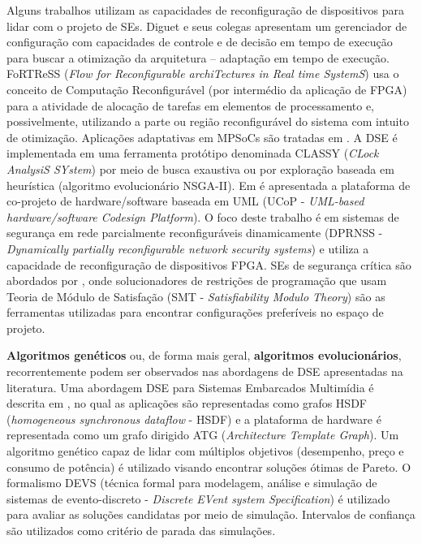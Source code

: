 \documentclass[tese-proposta,nocipinfo]{texufpel}
\begin{document}
Alguns trabalhos utilizam as capacidades de reconfiguração de dispositivos para lidar com o projeto de SEs. Diguet e seus colegas \cite{Diguet:2011:CSH:1952522.1952531} apresentam um gerenciador de configuração com capacidades de controle e de decisão em tempo de execução para buscar a otimização da arquitetura -- adaptação em tempo de execução. FoRTReSS (\textit{Flow for Reconfigurable archiTectures in Real time SystemS}) \cite{Duhem2015} usa o conceito de Computação Reconfigurável (por intermédio da aplicação de FPGA) para a atividade de alocação de tarefas em elementos de processamento e, possivelmente, utilizando a parte ou região reconfigurável do sistema com intuito de otimização. Aplicações adaptativas em MPSoCs são tratadas em \cite{An2015172}. A DSE é implementada em uma ferramenta protótipo denominada CLASSY (\textit{CLock AnalysiS SYstem}) por meio de busca exaustiva ou por exploração baseada em heurística (algoritmo evolucionário NSGA-II). Em \cite{Huang201088} é apresentada a plataforma de co-projeto de hardware/software baseada em UML (UCoP - \textit{UML-based hardware/software Codesign Platform}). O foco deste trabalho é em sistemas de segurança em rede parcialmente reconfiguráveis dinamicamente (DPRNSS - \textit{Dynamically partially reconfigurable network security systems}) e utiliza a capacidade de reconfiguração de dispositivos FPGA. SEs de segurança crítica são abordados por \cite{Adler:2011:CMV:1880050.1880056}, onde solucionadores de restrições de programação que usam Teoria de Módulo de Satisfação (SMT - \textit{Satisfiability Modulo Theory}) são as ferramentas utilizadas para encontrar configurações preferíveis no espaço de projeto.

\textbf{Algoritmos genéticos} ou, de forma mais geral, \textbf{algoritmos evolucionários}, recorrentemente podem ser observados nas abordagens de DSE apresentadas na literatura. Uma abordagem DSE para Sistemas Embarcados Multimídia é descrita em \cite{Nogueira2016}, no qual as aplicações são representadas como grafos HSDF (\textit{homogeneous synchronous dataflow} - HSDF) e a plataforma de hardware é representada como um grafo dirigido ATG (\textit{Architecture Template Graph}). Um algoritmo genético capaz de lidar com múltiplos objetivos (desempenho, preço e consumo de potência) é utilizado visando encontrar soluções ótimas de Pareto. O formalismo DEVS (técnica formal para modelagem, análise e simulação de sistemas de evento-discreto - \textit{Discrete EVent system Specification}) é utilizado para avaliar as soluções candidatas por meio de simulação. Intervalos de confiança são utilizados como critério de parada das simulações.
\end{document}
